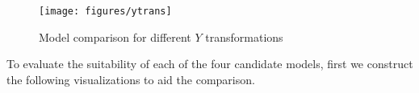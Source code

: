 \documentclass [11pt, proquest] {uwthesis}[2015/03/03]
\begin{document}

\begin{figure}
   \texttt{[image: figures/ytrans]} 
  \caption{Model comparison for different $Y$ transformations}
  \label{fig:y_transform}
\end{figure}


To evaluate the suitability of each of the four candidate models, first we construct the following visualizations to aid the comparison.
\end{document}
